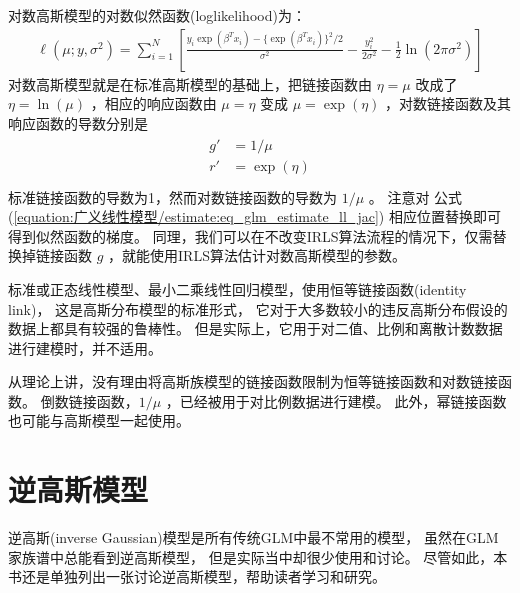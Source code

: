 \documentclass[letterpaper,10pt,english]{sphinxmanual}
\begin{document}
对数高斯模型的对数似然函数(log\sphinxhyphen{}likelihood)为：
\begin{equation}\label{equation:高斯模型/content:高斯模型/content:29}
\begin{split}\ell(\mu;y,\sigma^2) = \sum_{i=1}^N \left [
\frac{y_i \exp(\beta^Tx_i) - \{\exp(\beta^Tx_i)\}^2/2  }{\sigma^2}
-\frac{y_i^2}{2\sigma^2} - \frac{1}{2}\ln(2\pi\sigma^2)
\right ]\end{split}
\end{equation}
对数高斯模型就是在标准高斯模型的基础上，把链接函数由 \(\eta=\mu\) 改成了
\(\eta=\ln(\mu)\)
，相应的响应函数由 \(\mu=\eta\) 变成 \(\mu=\exp(\eta)\)
，对数链接函数及其响应函数的导数分别是
\begin{align}\label{equation:高斯模型/content:高斯模型/content:30}\!\begin{aligned}
g' &= 1/\mu\\
r' &= \exp(\eta)\\
\end{aligned}\end{align}
标准链接函数的导数为1，然而对数链接函数的导数为 \(1/\mu\) 。
注意对 公式(\ref{equation:广义线性模型/estimate:eq_glm_estimate_ll_jac}) 相应位置替换即可得到似然函数的梯度。
同理，我们可以在不改变IRLS算法流程的情况下，仅需替换掉链接函数 \(g\)
，就能使用IRLS算法估计对数高斯模型的参数。

标准或正态线性模型、最小二乘线性回归模型，使用恒等链接函数(identity link)，
这是高斯分布模型的标准形式，
它对于大多数较小的违反高斯分布假设的数据上都具有较强的鲁棒性。
但是实际上，它用于对二值、比例和离散计数数据进行建模时，并不适用。

从理论上讲，没有理由将高斯族模型的链接函数限制为恒等链接函数和对数链接函数。
倒数链接函数，\(1/\mu\)
，已经被用于对比例数据进行建模。
此外，幂链接函数也可能与高斯模型一起使用。


\chapter{逆高斯模型}
\label{\detokenize{_u9006_u9ad8_u65af_u6a21_u578b/content:id1}}\label{\detokenize{_u9006_u9ad8_u65af_u6a21_u578b/content::doc}}
逆高斯(inverse Gaussian)模型是所有传统GLM中最不常用的模型，
虽然在GLM家族谱中总能看到逆高斯模型，
但是实际当中却很少使用和讨论。
尽管如此，本书还是单独列出一张讨论逆高斯模型，帮助读者学习和研究。
\end{document}
